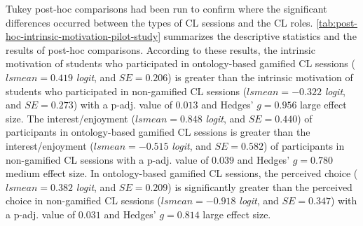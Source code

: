 Tukey post-hoc comparisons had been run to confirm where the significant differences occurred between the types of CL sessions and the CL roles. \autoref{tab:post-hoc-intrinsic-motivation-pilot-study} summarizes the descriptive statistics and the results of post-hoc comparisons. According to these results, the intrinsic motivation of students who participated in ontology-based gamified CL sessions ($lsmean=0.419$ \emph{logit}, and $SE = 0.206$) is greater than the intrinsic motivation of students who participated in non-gamified CL sessions ($lsmean=-0.322$ \emph{logit}, and $SE = 0.273$) with a p-adj. value of $0.013$ and Hedges' $g=0.956$ large effect size. The interest/enjoyment ($lsmean=0.848$ \emph{logit}, and $SE = 0.440$) of participants in ontology-based gamified CL sessions  is greater than the interest/enjoyment ($lsmean=-0.515$ \emph{logit}, and $SE = 0.582$) of participants in non-gamified CL sessions with a p-adj. value of $0.039$ and Hedges' $g=0.780$ medium effect size. In ontology-based gamified CL sessions, the perceived choice ($lsmean=0.382$ \emph{logit}, and $SE = 0.209$) is significantly greater than the perceived choice in non-gamified CL sessions ($lsmean=-0.918$ \emph{logit}, and $SE = 0.347$) with a p-adj. value of $0.031$ and Hedges' $g=0.814$ large effect size.

